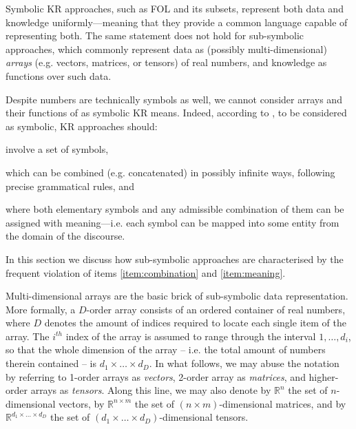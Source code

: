 \documentclass[12pt,a4paper,openright,twoside]{book}
\begin{document}
Symbolic KR approaches, such as FOL and its subsets, represent both data and knowledge uniformly---meaning that they provide a common language capable of representing both.
%
The same statement does not hold for sub-symbolic approaches, which commonly represent data as (possibly multi-dimensional) \emph{arrays} (e.g. vectors, matrices, or tensors) of real numbers, and knowledge as functions over such data.

Despite numbers are technically symbols as well, we cannot consider arrays and their functions of as symbolic KR means.
%
Indeed, according to \cite{Gelder90}, to be considered as symbolic, KR approaches should:
%
\begin{inlinelist}
    \item involve a set of symbols, 
    \item\label{item:combination} which can be combined (e.g. concatenated) in possibly infinite ways, following precise grammatical rules, and
    \item\label{item:meaning} where both elementary symbols and any admissible combination of them can be assigned with meaning---i.e. each symbol can be mapped into some entity from the domain of the discourse. 
\end{inlinelist}
%
In this section we discuss how sub-symbolic approaches are characterised by the frequent violation of items \ref{item:combination} and \ref{item:meaning}.

Multi-dimensional arrays are the basic brick of sub-symbolic data representation.
%
More formally, a $D$-order array consists of an ordered container of real numbers, where $D$ denotes the amount of indices required to locate each single item of the array.
%
The $i^{th}$ index of the array is assumed to range through the interval $1, \ldots, d_i$, so that the whole dimension of the array -- i.e. the total amount of numbers therein contained -- is $d_1 \times \ldots \times d_D$.
%
In what follows, we may abuse the notation by referring to 1-order arrays as \emph{vectors}, 2-order array as \emph{matrices}, and higher-order arrays as \emph{tensors}.
%
Along this line, we may also denote by $\mathbb{R}^{n}$ the set of $n$-dimensional vectors, by $\mathbb{R}^{n \times m}$ the set of $(n \times m)$-dimensional matrices, and by $\mathbb{R}^{d_1 \times \ldots \times d_D}$ the set of $(d_1 \times \ldots \times d_D)$-dimensional tensors.
\end{document}
